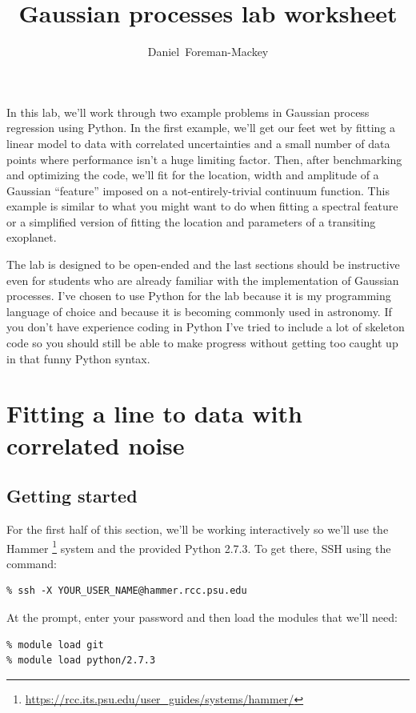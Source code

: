 \documentclass[12pt,preprint]{aastex}
\begin{document}
\title{%
    Gaussian processes lab worksheet
}

\author{%
    Daniel~Foreman-Mackey
}

In this lab, we'll work through two example problems in Gaussian process
regression using Python.
In the first example, we'll get our feet wet by fitting a linear model to data
with correlated uncertainties and a small number of data points where
performance isn't a huge limiting factor.
Then, after benchmarking and optimizing the code, we'll fit for the location,
width and amplitude of a Gaussian ``feature'' imposed on a
not-entirely-trivial continuum function.
This example is similar to what you might want to do when fitting a spectral
feature or a simplified version of fitting the location and parameters of a
transiting exoplanet.

The lab is designed to be open-ended and the last sections should be
instructive even for students who are already familiar with the implementation
of Gaussian processes.
I've chosen to use Python for the lab because it is my programming language of
choice and because it is becoming commonly used in astronomy.
If you don't have experience coding in Python I've tried to include a lot of
skeleton code so you should still be able to make progress without getting too
caught up in that funny Python syntax.

\section{Fitting a line to data with correlated noise}

\subsection{Getting started}

For the first half of this section, we'll be working interactively so we'll
use the Hammer%
\footnote{\url{https://rcc.its.psu.edu/user_guides/systems/hammer/}} system
and the provided Python 2.7.3.
To get there, SSH using the command:
\begin{lstlisting}
% ssh -X YOUR_USER_NAME@hammer.rcc.psu.edu
\end{lstlisting}
At the prompt, enter your password and then load the modules that we'll need:
\begin{lstlisting}
% module load git
% module load python/2.7.3
\end{lstlisting}
\end{document}
